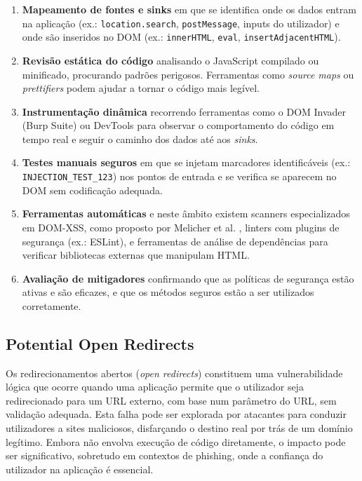 \begin{enumerate}
    \item \textbf{Mapeamento de fontes e sinks} em que se identifica onde os dados entram na aplicação (ex.: \texttt{location.search}, \texttt{postMessage}, inputs do utilizador) e onde são inseridos no DOM (ex.: \texttt{innerHTML}, \texttt{eval}, \texttt{insertAdjacentHTML}).
    
    \item \textbf{Revisão estática do código} analisando o JavaScript compilado ou minificado, procurando padrões perigosos. Ferramentas como \textit{source maps} ou \textit{prettifiers} podem ajudar a tornar o código mais legível.
    
    \item \textbf{Instrumentação dinâmica} recorrendo ferramentas como o DOM Invader (Burp Suite) ou DevTools para observar o comportamento do código em tempo real e seguir o caminho dos dados até aos \textit{sinks}.
    
    \item \textbf{Testes manuais seguros} em que se injetam marcadores identificáveis (ex.: \texttt{INJECTION\_TEST\_123}) nos pontos de entrada e se verifica se aparecem no DOM sem codificação adequada.
    
    \item \textbf{Ferramentas automáticas} e neste âmbito existem scanners especializados em DOM-XSS, como proposto por Melicher et al. \cite{ref33}, linters com plugins de segurança (ex.: ESLint), e ferramentas de análise de dependências para verificar bibliotecas externas que manipulam HTML.
    
    \item \textbf{Avaliação de mitigadores} confirmando que as políticas de segurança estão ativas e são eficazes, e que os métodos seguros estão a ser utilizados corretamente.
\end{enumerate}

\subsection{Potential Open Redirects}
\label{subsec:potential-open-redirects}

Os redirecionamentos abertos (\textit{open redirects}) constituem uma vulnerabilidade lógica que ocorre quando uma aplicação permite que o utilizador seja redirecionado para um URL externo, com base num parâmetro do URL, sem validação adequada. Esta falha pode ser explorada por atacantes para conduzir utilizadores a sites maliciosos, disfarçando o destino real por trás de um domínio legítimo. Embora não envolva execução de código diretamente, o impacto pode ser significativo, sobretudo em contextos de phishing, onde a confiança do utilizador na aplicação é essencial.

